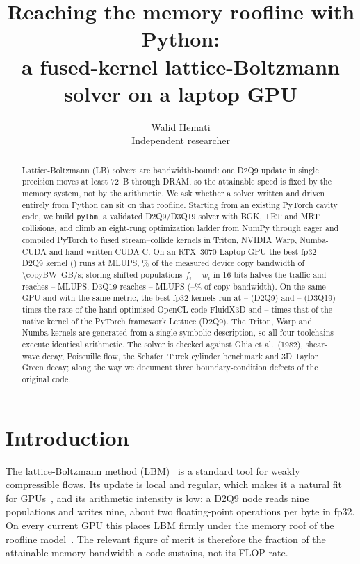 \documentclass[11pt]{article}
\title{Reaching the memory roofline with Python:\\
a fused-kernel lattice-Boltzmann solver on a laptop GPU}
\author{Walid Hemati\\ \small Independent researcher}
\date{}
\providecommand{\bestThreeDMLUPS}{--}\providecommand{\bestThreeDName}{--}
\providecommand{\bestThreeDPct}{--}\providecommand{\bestThreeDSixteenMLUPS}{--}
\providecommand{\bestSixteenMLUPS}{--}\providecommand{\bestSixteenName}{--}
\providecommand{\cpPyOverFxThree}{--}\providecommand{\cpPyOverFxTwo}{--}
\providecommand{\cpPyOverLtNativeTwo}{--}\providecommand{\cpPyOverLtTorchTwo}{--}
\begin{document}
\maketitle

\ifprovisional
\begin{center}
\end{center}
\fi

\begin{abstract}
Lattice-Boltzmann (LB) solvers are bandwidth-bound: one D2Q9 update in single precision
moves at least \SI{72}{B} through DRAM, so the attainable speed is fixed by the memory
system, not by the arithmetic. We ask whether a solver written and driven entirely from
Python can sit on that roofline. Starting from an existing PyTorch cavity code, we build
\texttt{pylbm}, a validated D2Q9/D3Q19 solver with BGK, TRT and MRT collisions, and climb an
eight-rung optimization ladder from NumPy through eager and compiled PyTorch to fused
stream--collide kernels in Triton, NVIDIA Warp, Numba-CUDA and hand-written CUDA C. On an
RTX~3070 Laptop GPU the best fp32 D2Q9 kernel (\bestFpThirtyTwoName) runs at
\bestFpThirtyTwoMLUPS{} MLUPS, \bestFpThirtyTwoPct\% of the measured device copy bandwidth
of \SI{\copyBW}{GB/s}; storing shifted populations $f_i-w_i$ in 16 bits halves the traffic and
reaches \bestSixteenMLUPS{} MLUPS. D3Q19 reaches \bestThreeDMLUPS{} MLUPS
(\bestThreeDPct\% of copy bandwidth). On the same GPU and with the same metric, the best fp32
kernels run at \cpPyOverFxTwo{} (D2Q9) and \cpPyOverFxThree{} (D3Q19) times the rate of the
hand-optimised OpenCL code FluidX3D and \cpPyOverLtNativeTwo{} times that of the native
kernel of the PyTorch framework Lettuce (D2Q9). The Triton, Warp and Numba kernels are
generated from a single symbolic description, so all four toolchains execute identical
arithmetic. The
solver is checked against Ghia et al.\ (1982), shear-wave decay, Poiseuille flow, the
Sch\"afer--Turek cylinder benchmark and 3D Taylor--Green decay; along the way we document
three boundary-condition defects of the original code.
\end{abstract}

\section{Introduction}
The lattice-Boltzmann method (LBM)~\citep{kruger2017,qian1992} is a standard tool for
weakly compressible flows. Its update is local and regular, which makes it a natural fit for
GPUs~\citep{tolke2008,obrecht2011,mawson2014}, and its arithmetic intensity is low: a D2Q9
node reads nine populations and writes nine, about two floating-point operations per byte
in fp32. On every current GPU this places LBM firmly under the memory roof of the roofline
model~\citep{williams2009}. The relevant figure of merit is therefore the fraction of the
attainable memory bandwidth a code sustains, not its FLOP rate.
\end{document}
